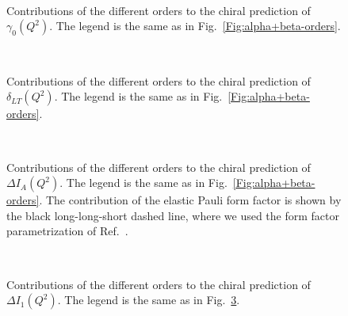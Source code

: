\documentclass[twocolumn,prc,showpacs,nofootinbib,preprintnumbers,amsmath,amssymb,superscriptaddress]{revtex4-1}
\begin{document}
\begin{figure}[H]
\begin{center}
\hspace{-0.3cm}\\[0.5cm] \hspace{-0.3cm} 
\caption{Contributions of the different orders to the chiral prediction of $\gamma_0(Q^2)$. The legend is the same as in Fig.~\ref{Fig:alpha+beta-orders}.  \label{Fig:gamma0-orders}}
\end{center}
\end{figure}
 
\begin{figure}[H]
\begin{center}
\hspace{-0.3cm}\\[0.5cm] \hspace{-0.3cm} 
\caption{Contributions of the different orders to the chiral prediction of $\delta_{LT}(Q^2)$. The legend is the same as in Fig.~\ref{Fig:alpha+beta-orders}.  \label{Fig:deltaLT-orders}}
\end{center}
\end{figure}

\begin{figure}[H]
\begin{center}
\hspace{-0.3cm}\\[0.5cm]\hspace{-0.3cm} 
\caption{Contributions of the different orders to the chiral prediction of $\Delta I_A(Q^2)$. The legend is the same as in Fig.~\ref{Fig:alpha+beta-orders}. The contribution of the elastic Pauli form factor is shown by the black long-long-short dashed line, where we used the form factor parametrization of Ref.~\cite{Bradford:2006yz}. \label{Fig:IA-orders-plot}}
\end{center}
\end{figure}

\begin{figure}[H]
\begin{center} 
\hspace{-0.3cm}\\[0.5cm] \hspace{-0.3cm} 
\caption{Contributions of the different orders to the chiral prediction of $\Delta I_1(Q^2)$. The legend is the same as in Fig.~\ref{Fig:IA-orders-plot}. \label{Fig:I1-orders-plot}}
\end{center}
\end{figure}
\end{document}
